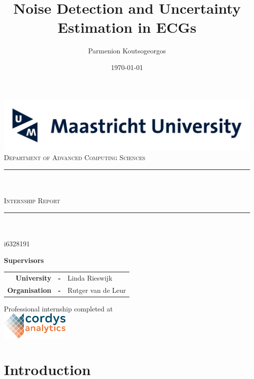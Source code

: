 \documentclass[a4paper,10pt]{article}
\title{Noise Detection and Uncertainty Estimation in ECGs}
\author{Parmenion Koutsogeorgos}
\date{\today}
\makeatletter
\let\thetitle\@title
\let\theauthor\@author
\let\thedate\@date
\makeatother
\begin{document}
\begin{titlepage}
	\centering
	\includegraphics[width=\textwidth]{um_logo_large.png} \\[0.5\baselineskip]
	\textsc{\Large Department of Advanced Computing Sciences}\\[2\baselineskip]

	\rule{\linewidth}{0.2 mm} \\[\baselineskip]
	{\huge \bfseries \thetitle}\\[\baselineskip]
	\textsc{\Large Internship Report}\\
	\rule{\linewidth}{0.2 mm}\\[2\baselineskip]

	{\Large\theauthor}\\[0.1cm]
	{\large i6328191}\\[1.5\baselineskip]
	\large\thedate

	\vspace{5cm}

	\textbf{Supervisors}\\[0.5\baselineskip]
	\begin{tabular}{r c l}
		\textbf{University}   & \textbf{-} & Linda Rieswijk     \\
		\textbf{Organisation} & \textbf{-} & Rutger van de Leur
	\end{tabular}

	\vfill

	Professional internship completed at\\[\baselineskip]
	\includegraphics[width=0.25\textwidth]{cordys.png}
\end{titlepage}

\tableofcontents
\listoffigures
\listoftables

\clearpage

\section{Introduction}
\end{document}
